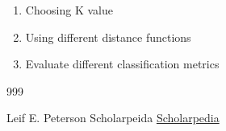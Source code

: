 \documentclass{report}
\begin{document}
\begin{enumerate}

\item Choosing K value

\item Using different distance functions

\item Evaluate different classification metrics

\end{enumerate}

\begin {thebibliography}{999}

	Leif E. Peterson
	Scholarpeida
	\href{http://www.scholarpedia.org/article/K-nearest_neighbor}{Scholarpedia}
	
\end{thebibliography}
\end{document}
